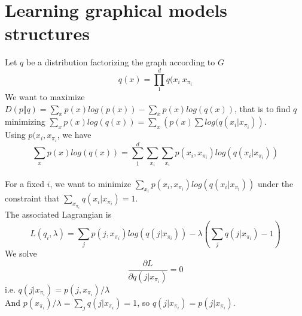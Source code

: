 \documentclass[11pt,a4paper]{article}
\begin{document}
\section{Learning graphical models structures}
Let $q$ be a distribution factorizing the graph according to $G$ $$ q(x) = \prod_1^d q(x_i \ x_{\pi_i}$$
We want to maximize $D(p \Vert q) = \sum_{x } p(x) log(p(x)) - \sum_x p(x) log (q(x)) $, that is to find $q$ minimizing  $\sum_x p(x) log (q(x)) = \sum_x \left( p(x) \sum log(q(x_i \vert x_{\pi_i}) \right)$.
\\Using $p(x_i, x_{\pi_i}$, we have  $$\sum_x p(x) log (q(x)) = \sum_1^d \sum_{x_i} \sum_{x_i} p(x_i, x_{\pi_i} ) log (q(x_i \vert x_{\pi_i}))$$
\\For a fixed $i$, we want to minimize $\sum_{x_i} p(x_i, x_{\pi_i}) log (q(x_i \vert x_{\pi_i}))$ under the constraint that $\sum_{x_{\pi_i}} q(x_i \vert x_{\pi_i}) = 1$.
\\The associated Lagrangian is 
$$L(q_i, \lambda) = \sum_j p(j, x_{\pi_i})log (q(j \vert x_{\pi_i}) ) - \lambda( \sum_j q(j \vert x_{\pi_i}) - 1)$$
We solve $$\frac{\partial L }{\partial q(j \vert x_{\pi_i})} = 0$$
i.e. $q(j \vert x_{\pi_i}) = p(j, x_{\pi_i})/\lambda$
\\And $p(x_{\pi_i})/\lambda = \sum_j q(j \vert x_{\pi_i}) = 1$, so $q(j \vert x_{\pi_i}) = p(j \vert x_{\pi_i}) $.
\end{document}
